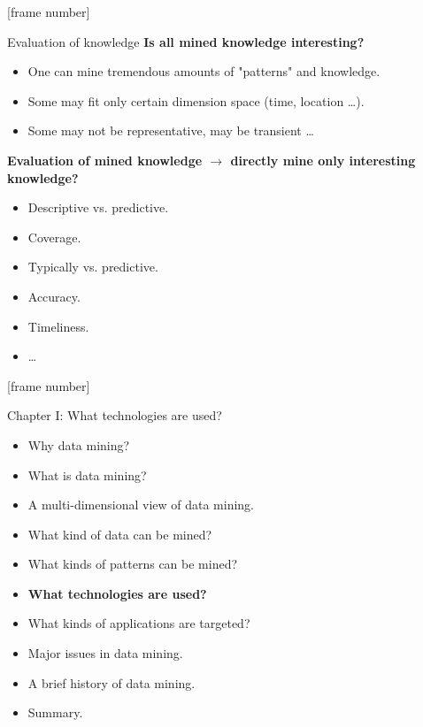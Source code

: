 \documentclass[aspectratio=169,t]{beamer}
\begin{document}
  {
    [frame number]
    \begin{frame}{Evaluation of knowledge}
    \textbf{Is all mined knowledge interesting?}
    \begin{itemize}
        \item One can mine tremendous amounts of "patterns" and knowledge.
        \item Some may fit only certain dimension space (time, location \ldots).
        \item Some may not be representative, may be transient \ldots
    \end{itemize}

    \textbf{Evaluation of mined knowledge $\rightarrow$ directly mine only interesting knowledge?}
    \begin{itemize}
        \item Descriptive vs. predictive.
        \item Coverage.
        \item Typically vs. predictive.
        \item Accuracy.
        \item Timeliness.
        \item \ldots
    \end{itemize}
    \end{frame}
  }

  {
    [frame number]
    \begin{frame}{Chapter I: What technologies are used?}
        \begin{itemize}
            \item Why data mining?
            \item What is data mining?
            \item A multi-dimensional view of data mining.
            \item What kind of data can be mined?
            \item What kinds of patterns can be mined?
            \item \textbf{What technologies are used?}
            \item What kinds of applications are targeted?
            \item Major issues in data mining.
            \item A brief history of data mining.
            \item Summary.
        \end{itemize}
    \end{frame}
  }
\end{document}

